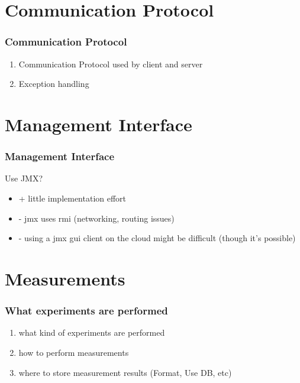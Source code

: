 \documentclass{beamer}
\begin{document}
\section{Communication Protocol}
\begin{frame}
\frametitle{Communication Protocol}
\begin{enumerate}

\item Communication Protocol used by client and server
\item Exception handling

\end{enumerate}

\end{frame}



\section{Management Interface}
\begin{frame}
\frametitle{Management Interface}
Use JMX?

\begin{itemize}

\item + little implementation effort
\item - jmx uses rmi (networking, routing issues)
\item - using a jmx gui client on the cloud might be difficult (though it's possible)

\end{itemize}
\end{frame}


\section{Measurements}
\begin{frame}
\frametitle{What experiments are performed}


\begin{enumerate}
\item what kind of experiments are performed
\item how to perform measurements
\item where to store measurement results (Format, Use DB, etc)
\end{enumerate}

\end{frame}
\end{document}
